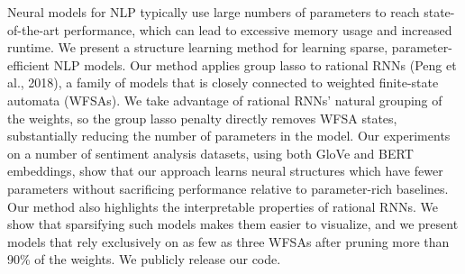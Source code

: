 Neural  models  for  NLP  typically  use  large numbers  of  parameters  to  reach  state-of-the-art performance, which can lead to excessive memory  usage  and  increased  runtime. We present a structure learning method for learning  sparse,  parameter-efficient  NLP  models. Our  method  applies  group  lasso  to  rational RNNs  (Peng  et  al.,  2018),  a  family  of  models that is closely connected to weighted finite-state  automata  (WFSAs). We  take  advantage of rational RNNs’ natural grouping of the weights,  so  the  group  lasso  penalty  directly removes WFSA states, substantially reducing the number of parameters in the model.  Our experiments  on  a  number  of  sentiment  analysis  datasets,  using  both  GloVe  and  BERT embeddings,  show  that  our  approach  learns neural  structures  which  have  fewer  parameters  without  sacrificing  performance  relative to parameter-rich baselines.  Our method also highlights  the  interpretable  properties  of  rational RNNs.  We show that sparsifying such models makes them easier to visualize, and we present models that rely exclusively on as few as three WFSAs after pruning more than 90\% of the weights. We publicly release our code.
